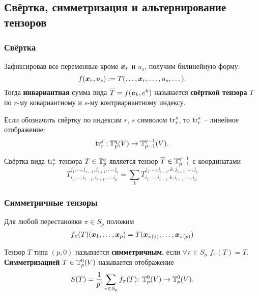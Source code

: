 \subsection{Свёртка, симметризация и альтернирование тензоров}
\subsubsection{Свёртка}

\begin{to_def}[свёртка]
    Зафиксировав все переменные кроме $\mbox{\boldmath $x$}_r$ и $u_s$, получим билинейную форму:
    \begin{equation}
        f(\mbox{\boldmath $x$}_r, u_s) := T(\dots, \mbox{\boldmath $x$}_r, \dots, u_s, \dots).
    \end{equation}
    Тогда \textbf{инвариантная} сумма вида
    $
        \overline{T} = f(\mbox{\boldmath $e$}_k, e^k)
    $
    называется \textbf{свёрткой тензора} $T$ по $r$-му ковариантному и $s$-му контрвариантному индексу.
\end{to_def} 

Если обозначить свёртку по индексам $r$, $s$ символом $\text{tr}^s_r$, то $\text{tr}^s_r$ -- линейное отображение:
\begin{equation}
    \text{tr}^s_r: \mathbb{T}^q_p(V) \to \mathbb{T}_{p-1}^{q-1}(V).
\end{equation}

\begin{to_thr}
    Свёртка вида $\text{tr}^s_r$ тензора $T \in \mathbb{T}^q_p$ является тензор $\overline{T} \in \mathbb{T}^{q-1}_{p-1}$ с координатами
    \begin{equation}
        \overline{T}^{
        j_1, \dots, j_{s-1}, j_{s+1}, \dots, j_q
        }_{
        i_1, \dots, i_{r-1}, i_{r+1}, \dots, i_p
        } = 
        \sum_k T^{
        j_1, \dots, j_{s-1}, k, j_{s+1}, \dots, j_q
        }_{
        i_1, \dots, i_{r-1}, k, i_{r+1}, \dots, i_p
        }
    \end{equation}
\end{to_thr}



\subsubsection{Симметричные тензоры}
Для любой перестановки $\pi \in S_p$ положим 
\begin{equation}
    f_{\pi}(T)(\mbox{\boldmath $x$}_1, \dots, \mbox{\boldmath $x$}_p) = T(\mbox{\boldmath $x$}_{\pi(1)}, \dots, \mbox{\boldmath $x$}_{\pi(p)})
\end{equation}
\begin{to_def}
    Тензор $T$ типа $(p, 0)$ называется \textbf{симметричным}, если $\forall \pi \in S_p$ $f_{\pi}(T) = T$. \textbf{Симметризацией} $T \in \mathbb{T}^0_p (V)$ называется отображение
    \begin{equation}
        S(T) = \frac{1}{p!} \sum_{\pi \in S_p} f_{\pi} (T) \colon  \mathbb{T}^0_p (V) \to \mathbb{T}^0_p (V).
    \end{equation}
\end{to_def}

